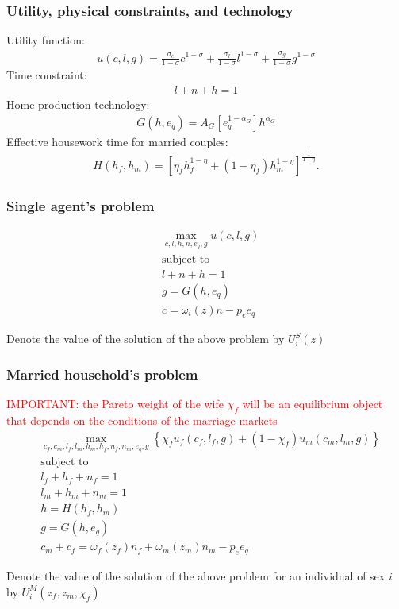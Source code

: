 \documentclass{beamer}
\begin{document}
\begin{frame}
	\frametitle{Utility, physical constraints, and technology}
	Utility function:
	\begin{align*}
	u\left(c,l,g\right) = \frac{\sigma_c}{1-\sigma}c^{1-\sigma}+\frac{\sigma_l}{1-\sigma}l^{1-\sigma}+\frac{\sigma_g}{1-\sigma}g^{1-\sigma}
	\end{align*}
	Time constraint:
	\begin{align*}
		l+n+h=1
	\end{align*}
	Home production technology:
	\begin{align*}
	G\left(h,e_q\right) = A_G\left[e_q^{1-\alpha_G}\right]h^{\alpha_G}
	\end{align*}
	Effective housework time for married couples:
	\begin{align*}
	H(h_f,h_m)=\left[\eta_f h_f^{1-\eta}+\left(1-\eta_f\right)h_m^{1-\eta}\right]^{\frac{1}{1-\eta}}.
	\end{align*}
\end{frame}

\begin{frame}
	\frametitle{Single agent's problem}
	
	\begin{align*}
	& \max_{c,l,h,n,e_q,g} u\left(c,l,g\right) \\
	& \text{subject to} \\
	& l+n+h = 1 \\
	& g = G\left(h,e_q\right) \\
	& c = \omega_i\left(z\right)n-p_e e_q
	\end{align*}
	
	Denote the value of the solution of the above problem by $U_i^S\left(z\right)$
	
\end{frame}

\begin{frame}
	\frametitle{Married household's problem}
	\small
	\textcolor{red}{IMPORTANT: the Pareto weight of the wife $\chi_f$ will be an equilibrium object that depends on the conditions of the marriage markets}
		\begin{align*}
		& \max_{c_f,c_m,l_f,l_m,h_m,h_f,n_f,n_m,e_q,g} \left\lbrace \chi_f u_f\left(c_f,l_f,g\right)+\left(1-\chi_f\right) u_m\left(c_m,l_m,g\right) \right\rbrace \\
		& \text{subject to} \\
		& l_f+h_f+n_f = 1 \\
		& l_m+h_m+n_m = 1 \\
		& h = H\left(h_f,h_m\right) \\
		& g = G\left(h,e_q\right) \\
		& c_m+c_f = \omega_f(z_f)n_f+\omega_m(z_m)n_m-p_e e_q
		\end{align*}
		
		Denote the value of the solution of the above problem for an individual of sex $i$  by $U_i^M(z_f,z_m,\chi_f)$
		
\end{frame}
\end{document}
